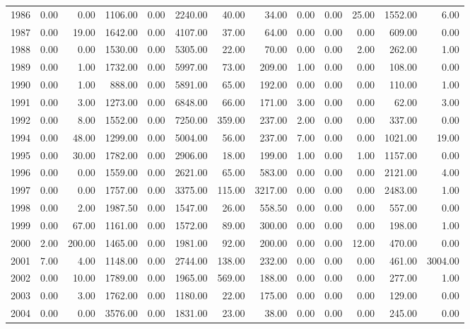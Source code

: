 \begin{table}
{\begin{tabular}{rrrrrrrrrrrrr}
  1986 & 0.00 & 0.00 & 1106.00 & 0.00 & 2240.00 & 40.00 & 34.00 & 0.00 & 0.00 & 25.00 & 1552.00 & 6.00 \\ 
  1987 & 0.00 & 19.00 & 1642.00 & 0.00 & 4107.00 & 37.00 & 64.00 & 0.00 & 0.00 & 0.00 & 609.00 & 0.00 \\ 
  1988 & 0.00 & 0.00 & 1530.00 & 0.00 & 5305.00 & 22.00 & 70.00 & 0.00 & 0.00 & 2.00 & 262.00 & 1.00 \\ 
  1989 & 0.00 & 1.00 & 1732.00 & 0.00 & 5997.00 & 73.00 & 209.00 & 1.00 & 0.00 & 0.00 & 108.00 & 0.00 \\ 
  1990 & 0.00 & 1.00 & 888.00 & 0.00 & 5891.00 & 65.00 & 192.00 & 0.00 & 0.00 & 0.00 & 110.00 & 1.00 \\ 
  1991 & 0.00 & 3.00 & 1273.00 & 0.00 & 6848.00 & 66.00 & 171.00 & 3.00 & 0.00 & 0.00 & 62.00 & 3.00 \\ 
  1992 & 0.00 & 8.00 & 1552.00 & 0.00 & 7250.00 & 359.00 & 237.00 & 2.00 & 0.00 & 0.00 & 337.00 & 0.00 \\ 
  1994 & 0.00 & 48.00 & 1299.00 & 0.00 & 5004.00 & 56.00 & 237.00 & 7.00 & 0.00 & 0.00 & 1021.00 & 19.00 \\ 
  1995 & 0.00 & 30.00 & 1782.00 & 0.00 & 2906.00 & 18.00 & 199.00 & 1.00 & 0.00 & 1.00 & 1157.00 & 0.00 \\ 
  1996 & 0.00 & 0.00 & 1559.00 & 0.00 & 2621.00 & 65.00 & 583.00 & 0.00 & 0.00 & 0.00 & 2121.00 & 4.00 \\ 
  1997 & 0.00 & 0.00 & 1757.00 & 0.00 & 3375.00 & 115.00 & 3217.00 & 0.00 & 0.00 & 0.00 & 2483.00 & 1.00 \\ 
  1998 & 0.00 & 2.00 & 1987.50 & 0.00 & 1547.00 & 26.00 & 558.50 & 0.00 & 0.00 & 0.00 & 557.00 & 0.00 \\ 
  1999 & 0.00 & 67.00 & 1161.00 & 0.00 & 1572.00 & 89.00 & 300.00 & 0.00 & 0.00 & 0.00 & 198.00 & 1.00 \\ 
  2000 & 2.00 & 200.00 & 1465.00 & 0.00 & 1981.00 & 92.00 & 200.00 & 0.00 & 0.00 & 12.00 & 470.00 & 0.00 \\ 
  2001 & 7.00 & 4.00 & 1148.00 & 0.00 & 2744.00 & 138.00 & 232.00 & 0.00 & 0.00 & 0.00 & 461.00 & 3004.00 \\ 
  2002 & 0.00 & 10.00 & 1789.00 & 0.00 & 1965.00 & 569.00 & 188.00 & 0.00 & 0.00 & 0.00 & 277.00 & 1.00 \\ 
  2003 & 0.00 & 3.00 & 1762.00 & 0.00 & 1180.00 & 22.00 & 175.00 & 0.00 & 0.00 & 0.00 & 129.00 & 0.00 \\ 
  2004 & 0.00 & 0.00 & 3576.00 & 0.00 & 1831.00 & 23.00 & 38.00 & 0.00 & 0.00 & 0.00 & 245.00 & 0.00 \\ 

\end{tabular}}
\end{table}
